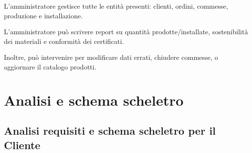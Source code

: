 \documentclass{article}
\begin{document}
\noindent L'amministratore gestisce tutte le entità presenti: clienti, ordini, commesse, produzione e installazione.

\noindent L’amministratore può scrivere report su quantità prodotte/installate, sostenibilità dei materiali e conformità dei certificati.

\noindent Inoltre, può intervenire per modificare dati errati, chiudere commesse, o aggiornare il catalogo prodotti.

\section{Analisi e schema scheletro}
\subsection{Analisi requisiti e schema scheletro per il Cliente}
\end{document}

